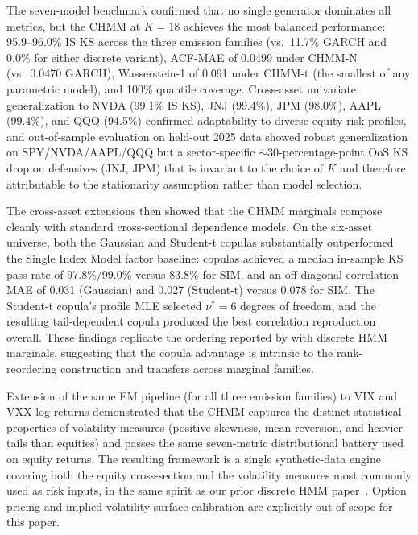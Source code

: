 The seven-model benchmark confirmed that no single generator dominates all metrics, but the CHMM at $K = 18$ achieves the most balanced performance: 95.9--96.0\% IS KS across the three emission families (vs.\ 11.7\% GARCH and 0.0\% for either discrete variant), ACF-MAE of 0.0499 under CHMM-N (vs.\ 0.0470 GARCH), Wasserstein-1 of 0.091 under CHMM-t (the smallest of any parametric model), and 100\% quantile coverage.
Cross-asset univariate generalization to NVDA (99.1\% IS KS), JNJ (99.4\%), JPM (98.0\%), AAPL (99.4\%), and QQQ (94.5\%) confirmed adaptability to diverse equity risk profiles, and out-of-sample evaluation on held-out 2025 data showed robust generalization on SPY/NVDA/AAPL/QQQ but a sector-specific $\sim$30-percentage-point OoS KS drop on defensives (JNJ, JPM) that is invariant to the choice of $K$ and therefore attributable to the stationarity assumption rather than model selection.

The cross-asset extensions then showed that the CHMM marginals compose cleanly with standard cross-sectional dependence models.
On the six-asset universe, both the Gaussian and Student-t copulas substantially outperformed the Single Index Model factor baseline: copulas achieved a median in-sample KS pass rate of 97.8\%/99.0\% versus 83.8\% for SIM, and an off-diagonal correlation MAE of 0.031 (Gaussian) and 0.027 (Student-t) versus 0.078 for SIM.
The Student-t copula's profile MLE selected $\nu^* = 6$ degrees of freedom, and the resulting tail-dependent copula produced the best correlation reproduction overall.
These findings replicate the ordering reported by \citet{alswaidan2026hybrid} with discrete HMM marginals, suggesting that the copula advantage is intrinsic to the rank-reordering construction and transfers across marginal families.

Extension of the same EM pipeline (for all three emission families) to VIX and VXX log returns demonstrated that the CHMM captures the distinct statistical properties of volatility measures (positive skewness, mean reversion, and heavier tails than equities) and passes the same seven-metric distributional battery used on equity returns.
The resulting framework is a single synthetic-data engine covering both the equity cross-section and the volatility measures most commonly used as risk inputs, in the same spirit as our prior discrete HMM paper~\citep{alswaidan2026hybrid}.
Option pricing and implied-volatility-surface calibration are explicitly out of scope for this paper.

